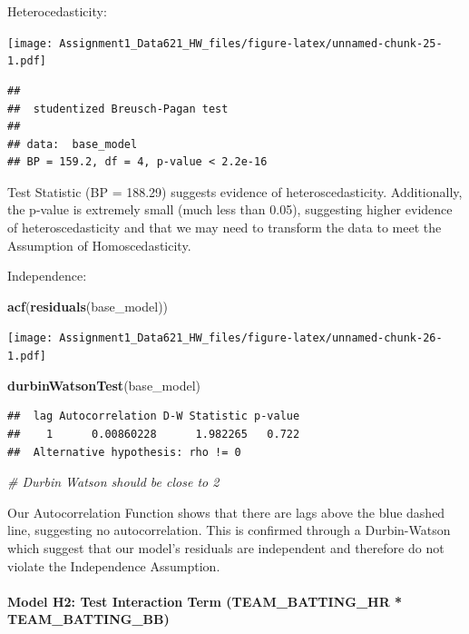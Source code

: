 \documentclass[
]{article}
\newenvironment{Shaded}{\begin{snugshade}}{\end{snugshade}}
\newcommand{\CommentTok}[1]{\textcolor[rgb]{0.56,0.35,0.01}{\textit{#1}}}
\newcommand{\FunctionTok}[1]{\textcolor[rgb]{0.13,0.29,0.53}{\textbf{#1}}}
\newcommand{\NormalTok}[1]{#1}
\begin{document}
Heterocedasticity:

\texttt{[image: Assignment1\_Data621\_HW\_files/figure-latex/unnamed-chunk-25-1.pdf]}

\begin{verbatim}
## 
##  studentized Breusch-Pagan test
## 
## data:  base_model
## BP = 159.2, df = 4, p-value < 2.2e-16
\end{verbatim}

Test Statistic (BP = 188.29) suggests evidence of heteroscedasticity.
Additionally, the p-value is extremely small (much less than 0.05),
suggesting higher evidence of heteroscedasticity and that we may need to
transform the data to meet the Assumption of Homoscedasticity.

Independence:

\begin{Shaded}
\begin{Highlighting}[]
\FunctionTok{acf}\NormalTok{(}\FunctionTok{residuals}\NormalTok{(base\_model))}
\end{Highlighting}
\end{Shaded}

\texttt{[image: Assignment1\_Data621\_HW\_files/figure-latex/unnamed-chunk-26-1.pdf]}

\begin{Shaded}
\begin{Highlighting}[]
\FunctionTok{durbinWatsonTest}\NormalTok{(base\_model)}
\end{Highlighting}
\end{Shaded}

\begin{verbatim}
##  lag Autocorrelation D-W Statistic p-value
##    1      0.00860228      1.982265   0.722
##  Alternative hypothesis: rho != 0
\end{verbatim}

\begin{Shaded}
\begin{Highlighting}[]
\CommentTok{\# Durbin Watson should be close to 2}
\end{Highlighting}
\end{Shaded}

Our Autocorrelation Function shows that there are lags above the blue
dashed line, suggesting no autocorrelation. This is confirmed through a
Durbin-Watson which suggest that our model's residuals are independent
and therefore do not violate the Independence Assumption.

\paragraph{Model H2: Test Interaction Term (TEAM\_BATTING\_HR *
TEAM\_BATTING\_BB)}\label{model-h2-test-interaction-term-team_batting_hr-team_batting_bb}
\end{document}
